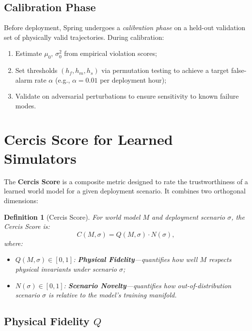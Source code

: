 \documentclass[11pt,twocolumn]{article}
\newtheorem{definition}[theorem]{Definition}
\theoremstyle{definition}
\begin{document}
\subsection{Calibration Phase}

Before deployment, Spring undergoes a \emph{calibration phase} on a held-out
validation set of physically valid trajectories.  During calibration:
\begin{enumerate}[leftmargin=*,nosep]
  \item Estimate $\mu_0$, $\sigma_0^2$ from empirical violation scores;
  \item Set thresholds $(h_f, h_m, h_s)$ via permutation testing to achieve a
    target false-alarm rate $\alpha$ (e.g., $\alpha = 0.01$ per deployment hour);
  \item Validate on adversarial perturbations to ensure sensitivity to known
    failure modes.
\end{enumerate}

\section{Cercis Score for Learned Simulators}
\label{sec:cercis}

The \textbf{Cercis Score} is a composite metric designed to rate the
trustworthiness of a learned world model for a given deployment scenario.  It
combines two orthogonal dimensions:

\begin{definition}[Cercis Score]
For world model $M$ and deployment scenario $\sigma$, the Cercis Score is:
\begin{equation}\label{eq:cercis}
  C(M, \sigma) = Q(M, \sigma) \cdot N(\sigma),
\end{equation}
where:
\begin{itemize}[nosep]
  \item $Q(M, \sigma) \in [0,1]$: \textbf{Physical Fidelity}---quantifies how
    well $M$ respects physical invariants under scenario $\sigma$;
  \item $N(\sigma) \in [0,1]$: \textbf{Scenario Novelty}---quantifies how
    out-of-distribution scenario $\sigma$ is relative to the model's training
    manifold.
\end{itemize}
\end{definition}

\subsection{Physical Fidelity $Q$}
\end{document}
